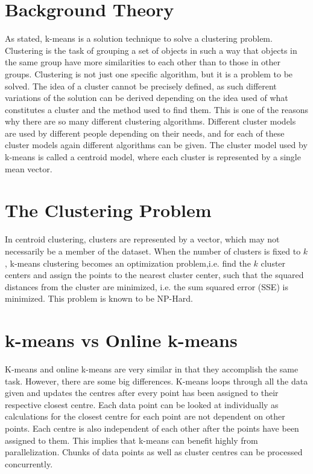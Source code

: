 \documentclass{article}
\begin{document}
\section{Background Theory}
As stated, k-means is a solution technique to solve a clustering problem. Clustering is the task of grouping a set of objects in such a way that objects in the same group have more similarities to each other than to those in other groups. Clustering is not just one specific algorithm, but it is a problem to be solved. The idea of a cluster cannot be precisely defined, as such different variations of the solution can be derived depending on the idea used of what constitutes a cluster and the method used to find them. This is one of the reasons why there are so many different clustering algorithms. Different cluster models are used by different people depending on their needs, and for each of these cluster models again different algorithms can be given. The cluster model used by k-means is called a centroid model, where each cluster is represented by a single mean vector.

\section{The Clustering Problem \citep{wikiclusteranalysis}}
In centroid clustering, clusters are represented by a vector, which may not necessarily be a member of the dataset. When the number of clusters is fixed to $k$, k-means clustering becomes an optimization problem,i.e. find the $k$ cluster centers and assign the points to the nearest cluster center, such that the squared distances from the cluster are minimized, i.e. the sum squared error (SSE) is minimized. This problem is known to be NP-Hard.


\newpage
\section{k-means vs Online k-means}
K-means and online k-means are very similar in that they accomplish the same task. However, there are some big differences. K-means loops through all the data given and updates the centres after every point has been assigned to their respective closest centre. Each data point can be looked at individually as calculations for the closest centre for each point are not dependent on other points. Each centre is also independent of each other after the points have been assigned to them. This implies that k-means can benefit highly from parallelization. Chunks of data points as well as cluster centres can be processed concurrently.
\end{document}
